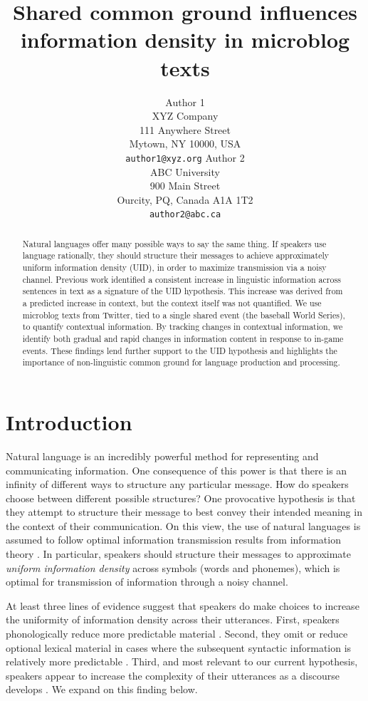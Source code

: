 \documentclass[11pt,letterpaper]{article}
\title{Shared common ground influences information density in microblog texts\Thanks{Thanks to...}}
\author{Author 1\\
XYZ Company\\
111 Anywhere Street\\
Mytown, NY 10000, USA\\
{\tt author1@xyz.org}
	  \And
          Author 2\\
ABC University\\
900 Main Street\\
Ourcity, PQ, Canada A1A 1T2\\
{\tt author2@abc.ca}
}
\date{}
\begin{document}
\maketitle
\begin{abstract}
Natural languages offer many possible ways to say the same thing. If speakers use language rationally, they should structure their messages to achieve approximately uniform information density (UID), in order to maximize transmission via a noisy channel. Previous work identified a consistent increase in linguistic information across sentences in text as a signature of the UID hypothesis. This increase was derived from a predicted increase in context, but the context itself was not quantified. We use microblog texts from Twitter, tied to a single shared event (the baseball World Series), to quantify contextual information. By tracking changes in contextual information, we identify both gradual and rapid changes in information content in response to in-game events. These findings lend further support to the UID hypothesis and highlights the importance of non-linguistic common ground for language production and processing.
\end{abstract}

\section{Introduction}

Natural language is an incredibly powerful method for representing and communicating information. One consequence of this power is that there is an infinity of different ways to structure any particular message. How do speakers choose between different possible structures? One provocative hypothesis is that they attempt to structure their message to best convey their intended meaning in the context of their communication. On this view, the use of natural languages is assumed to follow optimal information transmission results from information theory \cite{shannon1948}. In particular, speakers should structure their messages to approximate \emph{uniform information density} across symbols (words and phonemes), which is optimal for transmission of information through a noisy channel. 

At least three lines of evidence suggest that speakers do make choices to increase the uniformity of information density across their utterances. First, speakers phonologically reduce more predictable material \cite{aylett2004,aylett2006,bell2003}. Second, they omit or reduce optional lexical material in cases where the subsequent syntactic information is relatively more predictable \cite{levy2007,frank2008,jaeger2010}. Third, and most relevant to our current hypothesis, speakers appear to increase the complexity of their utterances as a discourse develops \cite{genzel2002,genzel2003,qian2012}. We expand on this finding below.
\end{document}
